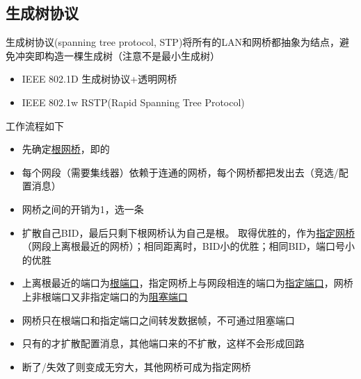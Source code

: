 \subsection{生成树协议}
生成树协议(spanning tree protocol, STP)将所有的LAN和网桥都抽象为结点，避免冲突即构造一棵生成树（注意不是最小生成树）
\begin{itemize}
\item IEEE 802.1D 生成树协议+透明网桥
\item IEEE 802.1w RSTP(Rapid Spanning Tree Protocol)
\end{itemize}

工作流程如下
\begin{itemize}
\item 先确定\underline{根网桥}，即的
\item 每个网段（需要集线器）依赖于连通的网桥，每个网桥都把发出去（竞选/配置消息）
\item 网桥之间的开销为1，选一条
\item 扩散自己BID，最后只剩下根网桥认为自己是根。
取得优胜的，作为\underline{指定网桥}（网段上离根最近的网桥）；相同距离时，BID小的优胜；相同BID，端口号小的优胜
\item {}上离根最近的端口为\underline{根端口}，指定网桥上与网段相连的端口为\underline{指定端口}，网桥上非根端口又非指定端口的为\underline{阻塞端口}
\item 网桥只在根端口和指定端口之间转发数据帧，不可通过阻塞端口
\item 只有的才扩散配置消息，其他端口来的不扩散，这样不会形成回路
\item 断了/失效了则变成无穷大，其他网桥可成为指定网桥
\end{itemize}

